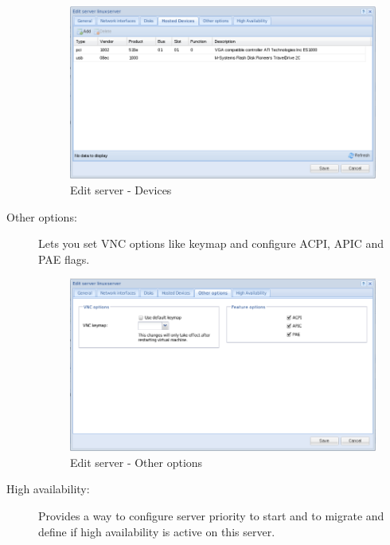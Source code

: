 \begin{description}
       \begin{figure}[H]
               \begin{center}
               \includegraphics[scale=0.5]{screenshots/server_edit_devices.png}
               \caption{Edit server - Devices}
               \label{fig:server_edit_devices}
               \end{center}
       \end{figure}

	\item[Other options:] Lets you set VNC options like keymap and configure ACPI, APIC and PAE flags.


		\begin{figure}[H]
        		\begin{center}
		        \includegraphics[scale=0.5]{screenshots/server_edit_otheroptions.png}
        		\caption{Edit server - Other options}
	        	\label{fig:server_edit_otheroptions}
	        	\end{center}
		\end{figure}

	\item[High availability:] Provides a way to configure server priority to start and to migrate and define if high availability is active on this server.



\end{description}
